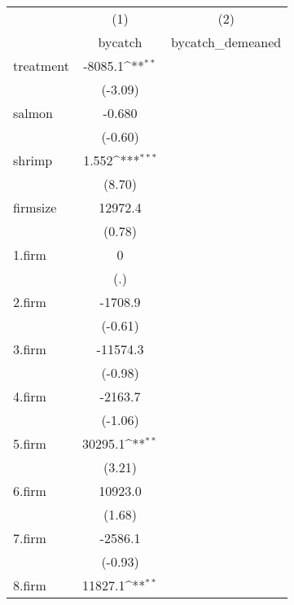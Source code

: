 {
\def\sym#1{\ifmmode^{#1}\else\(^{#1}\)\fi}
\begin{tabular}{l*{2}{c}}
\hline\hline
            &\multicolumn{1}{c}{(1)}&\multicolumn{1}{c}{(2)}\\
            &\multicolumn{1}{c}{bycatch}&\multicolumn{1}{c}{bycatch\_demeaned}\\
\hline
treatment   &     -8085.1\sym{**} &                     \\
            &     (-3.09)         &                     \\
[1em]
salmon      &      -0.680         &                     \\
            &     (-0.60)         &                     \\
[1em]
shrimp      &       1.552\sym{***}&                     \\
            &      (8.70)         &                     \\
[1em]
firmsize    &     12972.4         &                     \\
            &      (0.78)         &                     \\
[1em]
1.firm      &           0         &                     \\
            &         (.)         &                     \\
[1em]
2.firm      &     -1708.9         &                     \\
            &     (-0.61)         &                     \\
[1em]
3.firm      &    -11574.3         &                     \\
            &     (-0.98)         &                     \\
[1em]
4.firm      &     -2163.7         &                     \\
            &     (-1.06)         &                     \\
[1em]
5.firm      &     30295.1\sym{**} &                     \\
            &      (3.21)         &                     \\
[1em]
6.firm      &     10923.0         &                     \\
            &      (1.68)         &                     \\
[1em]
7.firm      &     -2586.1         &                     \\
            &     (-0.93)         &                     \\
[1em]
8.firm      &     11827.1\sym{**} &                     \\

\end{tabular}}
